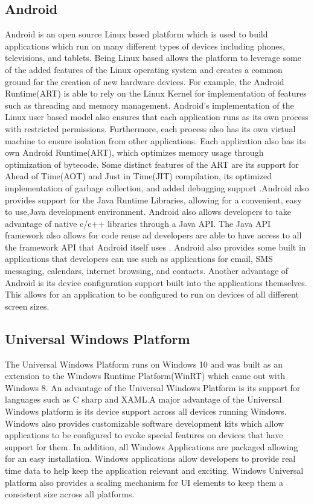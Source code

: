 \documentclass[onecolumn, draftclsnofoot,10pt, compsoc]{IEEEtran}
\begin{document}
       \subsection{Android}
       Android is an open source Linux based platform which is used to build applications which run on many different types of devices including phones, televisions, and tablets. Being Linux based allows the platform to leverage some of the added features of the Linux operating system and creates a common ground for the creation of new hardware devices. For example, the Android Runtime(ART) is able to rely on the Linux Kernel for implementation of features such as threading and memory management. Android's implementation of the Linux user based model also ensures that each application runs as its own process with restricted permissions. Furthermore, each process also has its own virtual machine to ensure isolation from other applications. Each application also has its own Android Runtime(ART), which optimizes memory usage through optimization of bytecode. Some distinct features of the ART are its support for Ahead of Time(AOT) and Just in Time(JIT) compilation, its optimized implementation of garbage collection, and added debugging support .Android also provides support for the Java Runtime Libraries, allowing for a convenient, easy to use,Java development environment. Android also allows developers to take advantage of native c/c++ libraries through a Java API. The Java API framework also allows for code reuse ad developers are able to have access to all the framework API that Android itself uses . Android also provides some built in applications that developers can use such as applications for email, SMS messaging, calendars, internet browsing, and contacts. Another advantage of Android is its device configuration support built into the applications themselves. This allows for an application to be configured to run on devices of all different screen sizes.\cite{Android}
       \subsection{Universal Windows Platform}
       The Universal Windows Platform runs on Windows 10 and was built as an extension to the Windows Runtime Platform(WinRT) which came out with Windows 8. An advantage of the Universal Windows Platform is its support for languages such as C sharp and XAML.A major advantage of the Universal Windows platform is its device support across all devices running Windows. Windows also provides customizable software development kits which allow applications to be configured to evoke special features on devices that have support for them. In addition, all Windows Applications are packaged allowing for an easy installation. Windows applications allow developers to provide real time data to help keep the application relevant and exciting. Windows Universal platform also provides a scaling mechanism for UI elements to keep them a consistent size across all platforms.\cite{Windows} 
\end{document}
